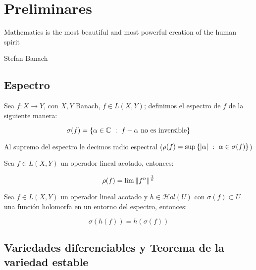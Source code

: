 \chapter{Preliminares}\label{ch:preliminares}

\epigraph{Mathematics is the most beautiful and most powerful creation of the human spirit}{Stefan Banach}

\section{Espectro}

\begin{definition}
	Sea $f : X \rightarrow Y$, con $X,Y$ Banach, $f \in L(X,Y)$; definimos el espectro de $f$ de la siguiente manera:
	
	\begin{equation*}
		\sigma(f) = \left\lbrace\alpha \in \mathbb{C} ~:~ f- \alpha \text{ no es inversible}\right\rbrace
	\end{equation*}
	
	Al supremo del espectro le decimos radio espectral (\eg $\rho(f) = \sup \left\lbrace\left\lvert\alpha\right\rvert ~:~ \alpha \in \sigma(f) \right\rbrace$)
	
\end{definition}

\begin{proposition}
	\label{prop: teorema de gelfand}
	Sea $f \in L(X,Y)$ un operador lineal acotado, entonces:
	
	\begin{equation*}
		\rho(f) = \lim \left\lVert f^n\right\rVert^{\frac{1}{n}}
	\end{equation*}
	
\end{proposition}

\begin{proposition}
	\label{prop: calculo funcional}
	
	Sea $f \in L(X,Y)$ un operador lineal acotado y $h \in \mathcal{H}ol (U)$ con $\sigma(f) \subset U$ una funci\'on holomorfa en un entorno del espectro, entonces:
	
	\begin{equation*}
		\sigma \left(h(f)\right) = h(\sigma(f))
	\end{equation*}
	
\end{proposition}

\section{Variedades diferenciables y Teorema de la variedad estable}

